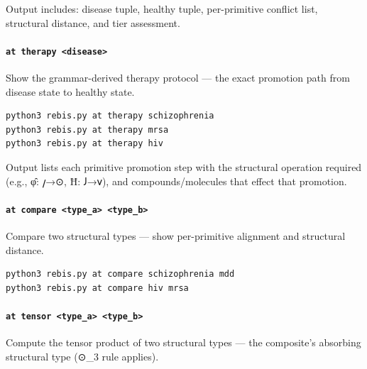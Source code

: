 Output includes: disease tuple, healthy tuple, per-primitive conflict
list, structural distance, and tier assessment.

\hypertarget{at-therapy-disease}{%
\paragraph{\texorpdfstring{\texttt{at\ therapy\ \textless{}disease\textgreater{}}}{at therapy \textless disease\textgreater{}}}\label{at-therapy-disease}}

Show the grammar-derived therapy protocol --- the exact promotion path
from disease state to healthy state.

\begin{verbatim}
python3 rebis.py at therapy schizophrenia
python3 rebis.py at therapy mrsa
python3 rebis.py at therapy hiv
\end{verbatim}

Output lists each primitive promotion step with the structural operation
required (e.g., φ̂: 𐑢→⊙, Ħ: 𐑓→𐑫), and compounds/molecules that effect
that promotion.

\hypertarget{at-compare-type_a-type_b}{%
\paragraph{\texorpdfstring{\texttt{at\ compare\ \textless{}type\_a\textgreater{}\ \textless{}type\_b\textgreater{}}}{at compare \textless type\_a\textgreater{} \textless type\_b\textgreater{}}}\label{at-compare-type_a-type_b}}

Compare two structural types --- show per-primitive alignment and
structural distance.

\begin{verbatim}
python3 rebis.py at compare schizophrenia mdd
python3 rebis.py at compare hiv mrsa
\end{verbatim}

\hypertarget{at-tensor-type_a-type_b}{%
\paragraph{\texorpdfstring{\texttt{at\ tensor\ \textless{}type\_a\textgreater{}\ \textless{}type\_b\textgreater{}}}{at tensor \textless type\_a\textgreater{} \textless type\_b\textgreater{}}}\label{at-tensor-type_a-type_b}}

Compute the tensor product of two structural types --- the composite's
absorbing structural type (⊙\_3 rule applies).

